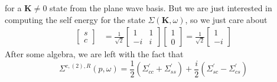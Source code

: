 for a $\mathbf{K}\neq 0$ state from the plane wave basis.
But we are just interested in computing the self energy for the state $\Sigma (\mathbf{K}, \omega)$, so we just care about
\begin{align}
\begin{bmatrix}
    s \\ c
\end{bmatrix}
&= \frac{1}{\sqrt{2}} \begin{bmatrix}
1 & 1 \\
 -i & i
\end{bmatrix} \begin{bmatrix}
    1 \\ 0
\end{bmatrix} = \frac{1}{\sqrt{2}} \begin{bmatrix}
1 \\ -i
\end{bmatrix}
\end{align}
After some algebra, we are left with the fact that
\begin{equation}
{\Sigma}^{c,(2),R}(p, \omega)=\frac{1}{2}\left(\Sigma_{c c}^{\prime}+\Sigma_{s s}^{\prime}\right)+\frac{i}{2}\left(\Sigma_{s c}^{\prime}-\Sigma_{c s}^{\prime}\right)
\end{equation}
